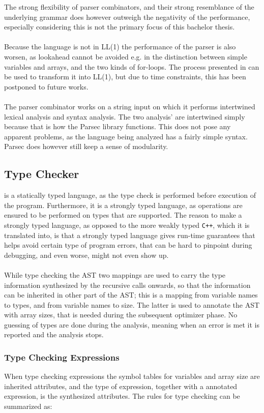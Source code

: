 The strong flexibility of parser combinators, and their strong resemblance of the underlying
grammar does however outweigh the negativity of the performance, especially considering this is
not the primary focus of this bachelor thesis.
\\
\\
Because the language is not in LL(1) the performance of the parser is also worsen, as lookahead
cannot be avoided e.g. in the distinction between simple variables and arrays, and the two
kinds of for-loops. The process presented in \cite{torben} can be used to transform it into
LL(1), but due to time constraints, this has been postponed to future works.
\\
\\
The parser combinator works on a string input on which it performs intertwined lexical analysis
and syntax analysis. The two analysis' are intertwined simply because that is how the Parsec
library functions. This does not pose any apparent problems, as the language being analyzed has
a fairly simple syntax. Parsec does however still keep a sense of modularity.

\subsection{Type Checker \rr}
\lan is a statically typed language, as the type check is performed before execution of the program.
Furthermore, it is a strongly typed language, as operations are ensured to be performed on
types that are supported. The reason to make \lan a strongly typed language, as opposed to
the more weakly typed \texttt{C++}, which it is translated into, is that a strongly typed
language gives run-time guarantees that helps avoid certain type of program errors, that can be
hard to pinpoint during debugging, and even worse, might not even show up.
\\
\\
While type checking the AST two mappings are used to carry the type information synthesized by the
recursive calls onwards, so that the information can be inherited in other part of the AST; this
is a mapping from variable names to types, and from variable names to size. The latter is used
to annotate the AST with array sizes, that is needed during the subsequent optimizer phase.
No guessing of types are done during the analysis, meaning when an error is met it is reported
and the analysis stops.

\subsubsection{Type Checking Expressions}
When type checking expressions the symbol tables for variables and array size are inherited
attributes, and the type of expression, together with a annotated expression,
is the synthesized attributes. The rules for type checking
can be summarized as:

